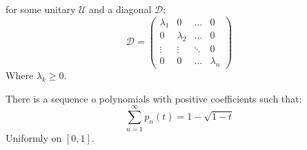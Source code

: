 \documentclass[crop=false,class=book,oneside]{standalone}                      %
\begin{document}
        for some unitary $\mathcal{U}$ and a diagonal
        $\mathcal{D}$:
        \begin{equation}
            \mathcal{D}=
                \begin{pmatrix}
                    \lambda_{1}&0&\dots&0\\
                    0&\lambda_{2}&\dots&0\\
                    \vdots&\vdots&\ddots&0\\
                    0&0&\dots&\lambda_{n}
                \end{pmatrix}
        \end{equation}
        Where $\lambda_{k}\geq{0}$.
        \begin{theorem}
            There is a sequence o polynomials with positive
            coefficients such that:
            \begin{equation}
                \sum_{n=1}^{\infty}p_{n}(t)=1-\sqrt{1-t}
            \end{equation}
            Uniformly on $[0,1]$.
        \end{theorem}
\end{document}
